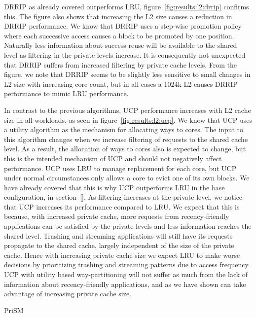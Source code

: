 DRRIP as already covered outperforms LRU, figure~\ref{fig:results:l2:drrip} confirms this.
The figure also shows that increasing the L2 size causes a reduction in DRRIP performance.
We know that DRRIP uses a step-wise promotion policy where each successive access causes a block to be promoted by one position.
Naturally less information about success reuse will be available to the shared level as filtering in the private levels increase.
It is consequently not unexpected that DRRIP suffers from increased filtering by private cache levels.
From the figure, we note that DRRIP seems to be slightly less sensitive to small changes in L2 size with increasing core count, but in all cases a 1024k L2 causes DRRIP performance to mimic LRU performance.

In contrast to the previous algorithms, UCP performance increases with L2 cache size in all workloads, as seen in figure~\ref{fig:results:l2:ucp}.
We know that UCP uses a utility algorithm as the mechanism for allocating ways to cores. 
The input to this algorithm changes when we increase filtering of requests to the shared cache level.
As a result, the allocation of ways to cores also is expected to change, but this is the intended mechanism of UCP and should not negatively affect performance.
UCP uses LRU to manage replacement for each core, but UCP under normal circumstances only allows a core to evict one of its own blocks. 
We have already covered that this is why UCP outperforms LRU in the base configuration, in section~\ref{}. 
As filtering increases at the private level, we notice that UCP increases its performance compared to LRU. 
We expect that this is because, with increased private cache, more requests from recency-friendly applications can be satisfied by the private levels and less information reaches the shared level.
Trashing and streaming applications will still have its requests propagate to the shared cache, largely independent of the size of the private cache. 
Hence with increasing private cache size we expect LRU to make worse decisions by prioritizing trashing and streaming patterns due to access frequency.
UCP with utility based way-partitioning will not suffer as much from the lack of information about recency-friendly applications, and as we have shown can take advantage of increasing private cache size.

PriSM~\todo{}

